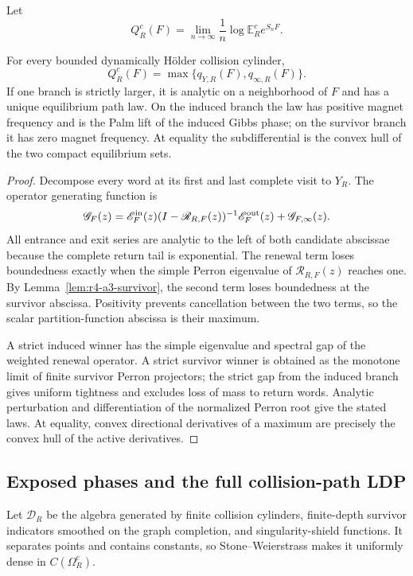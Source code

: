 Let
\[
 Q_R^c(F)=\lim_{n\to\infty}\frac1n
 \log\mathbb E_R^c e^{S_nF}.
\]

\begin{theorem}
\label{thm:r3-a3-block}
For every bounded dynamically H\"older collision cylinder,
\[
 \boxed{Q_R^c(F)=\max\{q_{Y,R}(F),q_{\infty,R}(F)\}.}
\]
If one branch is strictly larger, it is analytic on a neighborhood of \(F\)
and has a unique equilibrium path law.  On the induced branch the law has
positive magnet frequency and is the Palm lift of the induced Gibbs phase; on
the survivor branch it has zero magnet frequency.  At equality the
subdifferential is the convex hull of the two compact equilibrium sets.
\end{theorem}

\begin{proof}
Decompose every word at its first and last complete visit to \(Y_R\).  The
operator generating function is
\[
 \mathscr G_F(z)=
 \mathscr E_F^{\rm in}(z)
 (I-\mathscr R_{R,F}(z))^{-1}
 \mathscr E_F^{\rm out}(z)
 +\mathscr G_{F,\infty}(z).
\]
All entrance and exit series are analytic to the left of both candidate
abscissae because the complete return tail is exponential.  The renewal term
loses boundedness exactly when the simple Perron eigenvalue of
\(\mathscr R_{R,F}(z)\) reaches one.  By
Lemma~\ref{lem:r4-a3-survivor}, the second term loses boundedness at the
survivor abscissa.  Positivity prevents cancellation between the two terms,
so the scalar partition-function abscissa is their maximum.

A strict induced winner has the simple eigenvalue and spectral gap of the
weighted renewal operator.  A strict survivor winner is obtained as the
monotone limit of finite survivor Perron projectors; the strict gap from the
induced branch gives uniform tightness and excludes loss of mass to return
words.  Analytic perturbation and differentiation of the normalized Perron
root give the stated laws.  At equality, convex directional derivatives of a
maximum are precisely the convex hull of the active derivatives.
\end{proof}

\subsection{Exposed phases and the full collision-path LDP}

Let \(\mathscr D_R\) be the algebra generated by finite collision cylinders,
finite-depth survivor indicators smoothed on the graph completion, and
singularity-shield functions.  It separates points and contains constants, so
Stone--Weierstrass makes it uniformly dense in
\(C(\Omega_R^c)\).

